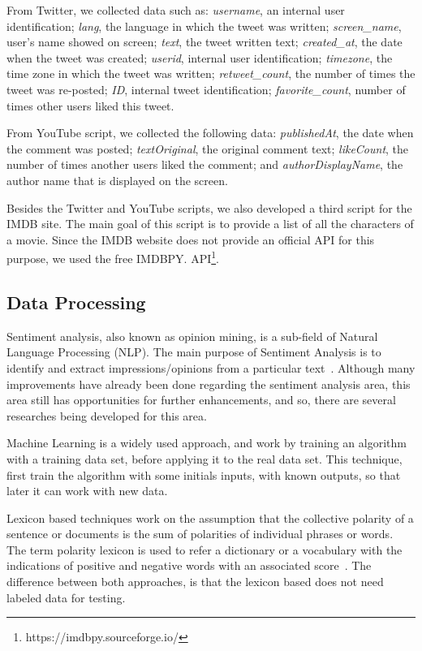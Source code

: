 From Twitter, we collected data such as: \textit{username}, an internal user identification; \textit{lang}, the language in which the tweet was written; \textit{screen\_name}, user's name showed on screen; \textit{text}, the tweet written text; \textit{created\_at}, the date when the tweet was created; \textit{userid}, internal user identification; \textit{timezone}, the time zone in which the tweet was written; \textit{retweet\_count}, the number of times the tweet was re-posted; \textit{ID}, internal tweet identification; \textit{favorite\_count}, number of times other users liked this tweet.

From YouTube script, we collected the following data: \textit{publishedAt}, the date when the comment was posted; \textit{textOriginal}, the original comment text; \textit{likeCount}, the number of times another users liked the comment; and \textit{authorDisplayName}, the author name that is displayed on the screen. 

Besides the Twitter and YouTube scripts, we also developed a third script for the IMDB site. The main goal of this script is to provide a list of all the characters of a movie. Since the IMDB website does not provide an official API for this purpose, we used the free IMDBPY. API\footnote{https://imdbpy.sourceforge.io/}.

\subsection{Data Processing}
\label{sec:DataProcessing}

Sentiment analysis, also known as opinion mining, is a sub-field of Natural Language Processing (NLP)\cite{Indurkhya:2010}. The main purpose of Sentiment Analysis is to identify and extract impressions/opinions from a particular text~\cite{vader}. Although many improvements have already been done regarding the sentiment analysis area, this area still has opportunities for further enhancements, and so, there are several researches being developed for this area\cite{DEVIKA201644}.

Machine Learning is a widely used approach, and work by training an algorithm with a training data set, before applying it to the real data set\cite{DEVIKA201644}. This technique, first train the algorithm with some initials inputs, with known outputs, so that later it can work with new data\cite{He:2012}.

Lexicon based techniques work on the assumption that the collective polarity of a sentence or documents is the sum of polarities of individual phrases or words\cite{DEVIKA201644}. The term polarity lexicon is used to refer a dictionary or a vocabulary with the indications of positive and negative words with an associated score~\cite{Dipanjan:2016}. The difference between both approaches, is that the lexicon based does not need labeled data for testing\cite{DEVIKA201644}. 

